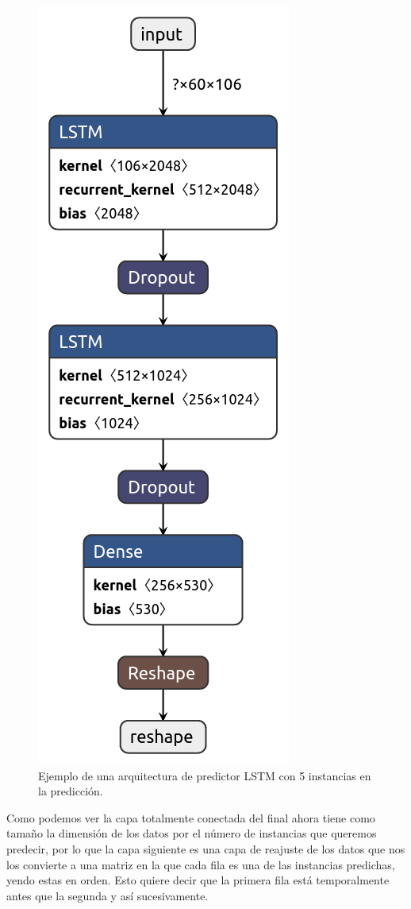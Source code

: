 \begin{figure}[H]
	\centering
	\includegraphics[scale=0.4]{imagenes/lstm-forecaster2.png}
	\caption{Ejemplo de una arquitectura de predictor LSTM con 5 instancias en la predicción.}
	\label{img:forecaster-lstm2}
\end{figure}

Como podemos ver la capa totalmente conectada del final ahora tiene como tamaño la dimensión de los datos por el número de instancias que queremos predecir, por lo que la capa siguiente es una capa de reajuste de los datos que nos los convierte a una matriz en la que cada fila es una de las instancias predichas, yendo estas en orden. Esto quiere decir que la primera fila está temporalmente antes que la segunda y así sucesivamente.

